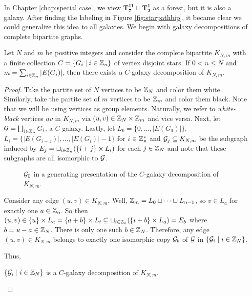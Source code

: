 In Chapter \ref{chap:special case}, we view $\mathbf{T_{7}^{11}}\sqcup\mathbf{T_{2}^{1}}$ as a forest, but it is also a galaxy. After finding the labeling in Figure \ref{fig:starpathbip}, it became clear we could generalize this idea to all galaxies. We begin with galaxy decompositions of complete bipartite graphs.

\begin{thm}\label{thm:galdecomp}
Let $N\text{ and }m$ be positive integers and consider the complete bipartite $K_{N,m}$ with a finite collection $C=\{G_{i}\mid i\in \mathbb{Z}_{n}\}$ of vertex disjoint stars. If $0<n\leq N$ and $m=\sum_{i\in \mathbb{Z}_{n}}|E(G_{i})|$, then there exists a $C$-galaxy decomposition of $K_{N,m}$.
\end{thm}
\begin{proof}
  Take the partite set of $N$ vertices to be $\mathbb{Z}_{N}$ and color them white. Similarly, take the partite set of $m$ vertices to be $\mathbb{Z}_{m}$ and color them black. Note that we will be using vertices as group elements. Naturally, we refer to \textit{white-black} vertices $uv$ in $K_{N,m}$ via $(u,v)\in \mathbb{Z}_{N}\times \mathbb{Z}_{m}$ and vice versa. Next, let $\mathcal{G}=\bigsqcup_{i\in \mathbb{Z}_{n}}G_{i}$, a $C$-galaxy. Lastly, let $L_{0}=\{0,\hdots,|E(G_{0})|\}$, $L_{i}=\{|E(G_{i-1})|,\hdots,|E(G_{i})|-1\}$ for $i\in \mathbb{Z}^{*}_{n}$ and $\mathcal{G}_{j}\subseteq K_{N,m}$ be the subgraph induced by $E_{j}=\sqcup_{i\in \mathbb{Z}_{n}} (\{i+j\}\times L_{i})$ for each $j\in \mathbb{Z}_{N}$ and note that these subgraphs are all isomorphic to $\mathcal{G}$.
\begin{figure}[H]
    \centering
    
    \caption{$\mathcal{G}_{0}$ in a generating presentation of the $C$-galaxy decomposition of $K_{N,m}$.}
    \label{fig:galdecomp}
\end{figure}
\noindent Consider any edge $(u,v)\in K_{N,m}$. Well, $\mathbb{Z}_{m}=L_{0}\sqcup \cdots \sqcup L_{n-1}$, so $v\in L_{a}$ for exactly one $a\in \mathbb{Z}_{n}$. So then $(u,v)\in \{u\}\times L_{a}=\{a+b\}\times L_{i}\subseteq \sqcup_{i\in \mathbb{Z}_{n}} (\{i+b\}\times L_{a})=E_{b}$ where $b=u-a\in \mathbb{Z}_{N}$. There is only one such $b\in \mathbb{Z}_{N}$. Therefore, any edge $(u,v)\in K_{N,m}$ belongs to exactly one isomorphic copy $\mathcal{G}_{b}$ of $\mathcal{G}$ in $\{\mathcal{G}_{i}\mid i\in \mathbb{Z}_{N}\}$.\newline

Thus,
\begin{center}
$\{\mathcal{G}_{i}\mid i\in \mathbb{Z}_{N}\}$ is a $C$-galaxy decomposition of $K_{N,m}$.
\end{center}
  
\end{proof}
